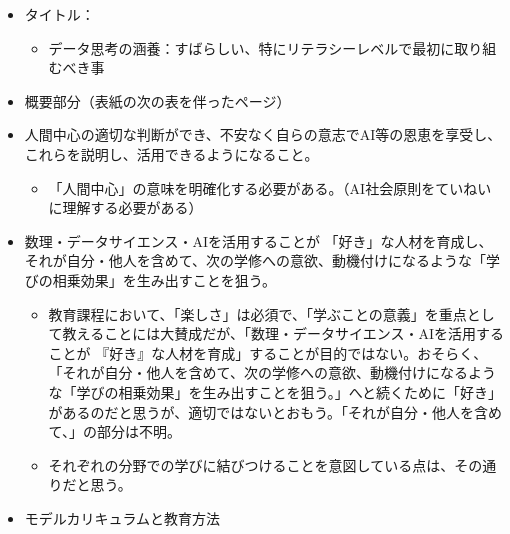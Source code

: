 \documentclass[
]{bxjsbook}
\providecommand{\tightlist}{%
  \setlength{\itemsep}{0pt}\setlength{\parskip}{0pt}}
\theoremstyle{definition}
\theoremstyle{definition}
\theoremstyle{definition}
\theoremstyle{definition}
\theoremstyle{remark}
\begin{document}
\begin{itemize}
\tightlist
\item
  タイトル：

  \begin{itemize}
  \tightlist
  \item
    データ思考の涵養：すばらしい、特にリテラシーレベルで最初に取り組むべき事
  \end{itemize}
\item
  概要部分（表紙の次の表を伴ったページ）
\item
  人間中心の適切な判断ができ、不安なく自らの意志でAI等の恩恵を享受し、これらを説明し、活用できるようになること。

  \begin{itemize}
  \tightlist
  \item
    「人間中心」の意味を明確化する必要がある。（AI社会原則をていねいに理解する必要がある）
  \end{itemize}
\item
  数理・データサイエンス・AIを活用することが 「好き」な人材を育成し、それが自分・他人を含めて、次の学修への意欲、動機付けになるような「学びの相乗効果」を生み出すことを狙う。

  \begin{itemize}
  \tightlist
  \item
    教育課程において、「楽しさ」は必須で、「学ぶことの意義」を重点として教えることには大賛成だが、「数理・データサイエンス・AIを活用することが 『好き』な人材を育成」することが目的ではない。おそらく、「それが自分・他人を含めて、次の学修への意欲、動機付けになるような「学びの相乗効果」を生み出すことを狙う。」へと続くために「好き」があるのだと思うが、適切ではないとおもう。「それが自分・他人を含めて、」の部分は不明。
  \item
    それぞれの分野での学びに結びつけることを意図している点は、その通りだと思う。
  \end{itemize}
\item
  モデルカリキュラムと教育方法


\end{itemize}
\end{document}
